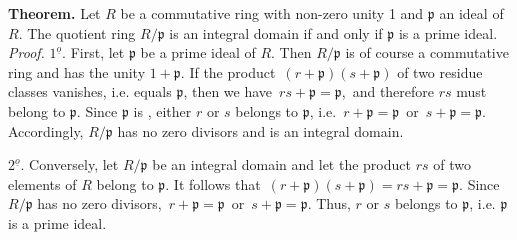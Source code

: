 \documentclass[12pt]{article}
\theoremstyle{definition}
\begin{document}
\textbf{Theorem.}  Let $R$ be a commutative ring with non-zero unity 1 and $\mathfrak{p}$ an ideal of $R$.  The quotient ring $R/\mathfrak{p}$ is an integral domain if and only if $\mathfrak{p}$ is a prime ideal.\\

{\em Proof.} $1^{\underline{o}}$.  First, let $\mathfrak{p}$ be a prime ideal of $R$.  Then $R/\mathfrak{p}$ is of course a commutative ring and has the unity $1+\mathfrak{p}$.  If the product\, $(r+\mathfrak{p})(s+\mathfrak{p})$ of two residue classes vanishes, i.e. equals $\mathfrak{p}$, then we have\, $rs+\mathfrak{p}= \mathfrak{p}$,\, and therefore $rs$ must belong to $\mathfrak{p}$.  Since $\mathfrak{p}$ is , either $r$ or $s$ belongs to $\mathfrak{p}$, i.e.\, $r+\mathfrak{p}= \mathfrak{p}$\, or\, $s+\mathfrak{p}= \mathfrak{p}$.\, Accordingly, 
$R/\mathfrak{p}$ has no zero divisors and is an integral domain. 

$2^{\underline{o}}$.  Conversely, let $R/\mathfrak{p}$ be an integral domain and let the product $rs$ of two elements of $R$ belong to $\mathfrak{p}$.  It follows that\, $(r+\mathfrak{p})(s+\mathfrak{p}) = rs+\mathfrak{p} = \mathfrak{p}$.  Since $R/\mathfrak{p}$ has no zero divisors,\, $r+\mathfrak{p} = \mathfrak{p}$\, or\, $s+\mathfrak{p} =\mathfrak{p} $.  Thus, $r$ or $s$ belongs to $\mathfrak{p}$, i.e. $\mathfrak{p}$ is a prime ideal. 

\end{document}
